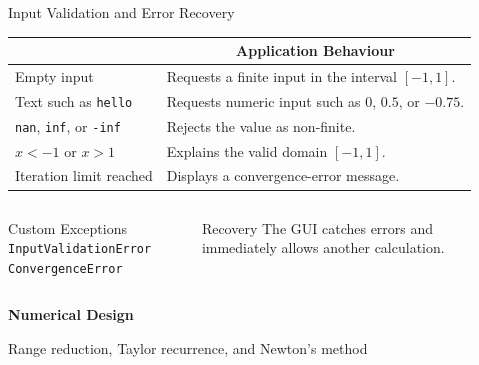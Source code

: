 \documentclass[aspectratio=169]{beamer}
\newcommand{\tableheader}[1]{%
    \multicolumn{1}{c}{\color{white}\textbf{#1}}%
}
\begin{document}
\begin{frame}{Input Validation and Error Recovery}
\small
{}
\begin{tabular}{p{}p{}}
\rowcolor{navy}
\tableheader{Condition} & \tableheader{Application Behaviour} \\
\toprule
Empty input & Requests a finite input in the interval \([-1,1]\). \\
Text such as \texttt{hello} & Requests numeric input such as \(0\), \(0.5\), or \(-0.75\). \\
\texttt{nan}, \texttt{inf}, or \texttt{-inf} & Rejects the value as non-finite. \\
\(x < -1\) or \(x > 1\) & Explains the valid domain \([-1,1]\). \\
Iteration limit reached & Displays a convergence-error message. \\
\bottomrule
\end{tabular}

\vspace{0.35cm}

\begin{columns}[T,onlytextwidth]
\begin{alertblock}{Custom Exceptions}
\texttt{InputValidationError}\\
\texttt{ConvergenceError}
\end{alertblock}

\begin{exampleblock}{Recovery}
The GUI catches errors and immediately allows another calculation.
\end{exampleblock}
\end{columns}
\end{frame}

\begin{frame}[plain]
\centering
\vfill
{\color{navy}\LARGE\bfseries Numerical Design\par}
\vspace{0.2cm}
{\large Range reduction, Taylor recurrence, and Newton's method\par}
\vfill
\end{frame}
\end{document}
